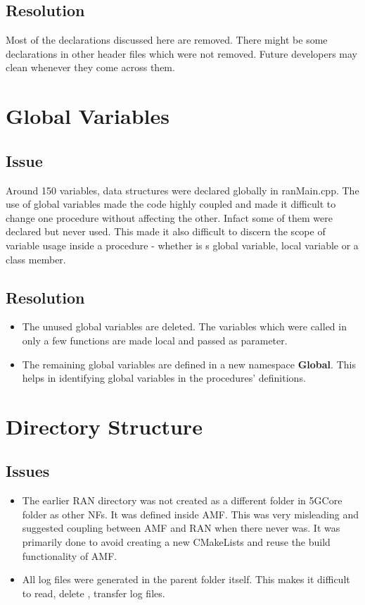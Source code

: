 \subsection{Resolution}
Most of the declarations discussed here are removed. There might be some declarations in other header files which were not removed. 
Future developers may clean whenever they come across them.
\section{Global Variables}
\subsection{Issue}
Around 150 variables, data structures were declared globally in ranMain.cpp. The use of
global variables made the code highly coupled and made it difficult to change one procedure
without affecting the other. Infact some of them were declared but never used.
This made it also difficult to discern the scope of variable usage inside a procedure - whether is s global variable,
local variable or a class member.
\subsection{Resolution}
\begin{itemize}
	\item The unused global variables are deleted. The variables which were called in only a few functions are made
	      local and passed as parameter.
	\item The remaining global variables are defined in a new namespace \textbf{Global}. This helps in identifying
	      global variables in the procedures' definitions.
\end{itemize}
\section{Directory Structure}
\subsection{Issues}
\begin{itemize}
	\item The earlier RAN directory was not created as a different folder in 5GCore folder as other NFs. 
It was defined inside AMF.  This was very misleading and suggested coupling between AMF and RAN when 
there never was. It was primarily done to avoid creating a new CMakeLists and reuse the build functionality
of AMF.
\item All log files were generated in the parent folder itself. This makes it difficult to read, delete
, transfer log files. 
\end{itemize}

